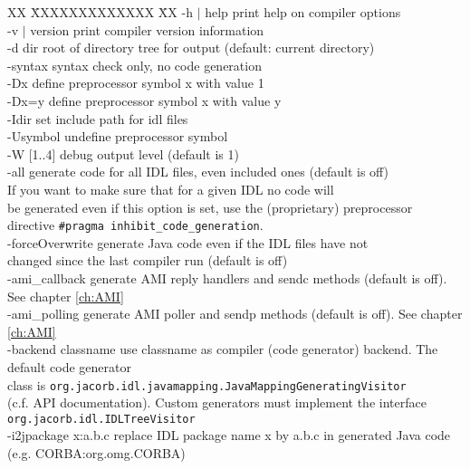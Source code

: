\begin{tabbing}
XX \= XXXXXXXXXXXXX \= XX \kill
\>  -h $|$ help \>  print help on compiler options\\
\>  -v $|$ version \> print compiler version information\\
\>  -d dir \> root of directory tree for output (default: current directory)\\
\>  -syntax \> syntax check only, no code generation\\
\>  -Dx \>  define preprocessor symbol x with value 1\\
\>  -Dx=y  \>  define preprocessor symbol x with value y\\
\>  -Idir  \>  set include path for idl files\\
\>  -Usymbol \> undefine preprocessor symbol\\
\>  -W [1..4] \> debug output level (default is 1)\\
\>  -all  \> generate code for all IDL files, even included ones
(default is off)\\
\> \> If you want to make sure that for a given IDL no code will\\
\> \>  be generated even if this option is set, use the (proprietary)
preprocessor \\
\> \> directive {\tt \#pragma   inhibit\_code\_generation}.\\
\>  -forceOverwrite \> generate Java code even if the IDL files have
not \\
\> \> changed since the last compiler run (default is off)\\
\>  -ami\_callback  \> generate AMI reply handlers and sendc methods
(default is off). See chapter \ref{ch:AMI}\\
\>  -ami\_polling  \>  generate AMI poller and sendp methods (default
is off). See chapter \ref{ch:AMI}\\
\>  -backend classname \>  use classname as compiler (code generator)
backend.  The default code generator \\
\> \>class is {\tt org.jacorb.idl.javamapping.JavaMappingGeneratingVisitor}\\
\> \>  (c.f. API documentation). Custom generators must implement the
interface\\
\> \> {\tt org.jacorb.idl.IDLTreeVisitor}\\
\> -i2jpackage x:a.b.c \>  replace IDL package name x by a.b.c in
generated Java code \\
\> \> (e.g. CORBA:org.omg.CORBA)\\

\end{tabbing}
